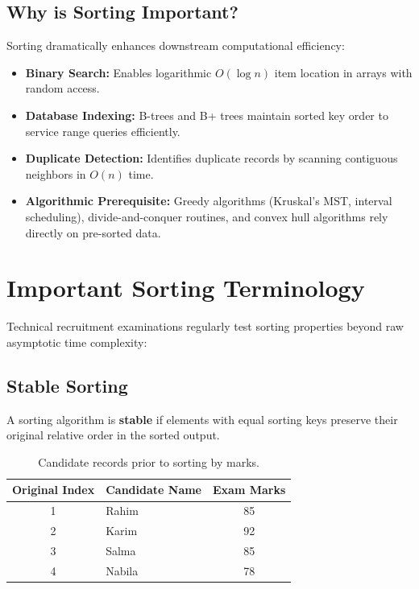 \subsection{Why is Sorting Important?}

Sorting dramatically enhances downstream computational efficiency:
\begin{itemize}
    \item \textbf{Binary Search:} Enables logarithmic $O(\log n)$ item location in arrays with random access.
    \item \textbf{Database Indexing:} B-trees and B+ trees maintain sorted key order to service range queries efficiently.
    \item \textbf{Duplicate Detection:} Identifies duplicate records by scanning contiguous neighbors in $O(n)$ time.
    \item \textbf{Algorithmic Prerequisite:} Greedy algorithms (Kruskal's MST, interval scheduling), divide-and-conquer routines, and convex hull algorithms rely directly on pre-sorted data.
\end{itemize}

\section{Important Sorting Terminology}

Technical recruitment examinations regularly test sorting properties beyond raw asymptotic time complexity:

\subsection{Stable Sorting}

A sorting algorithm is \textbf{stable} if elements with equal sorting keys preserve their original relative order in the sorted output.

\begin{table}[htbp]
\centering
\small
\begin{tabular}{c l c}
\toprule
\textbf{Original Index} & \textbf{Candidate Name} & \textbf{Exam Marks} \\
\midrule
1 & Rahim  & 85 \\
2 & Karim  & 92 \\
3 & Salma  & 85 \\
4 & Nabila & 78 \\
\bottomrule
\end{tabular}
\caption{Candidate records prior to sorting by marks.}
\end{table}

